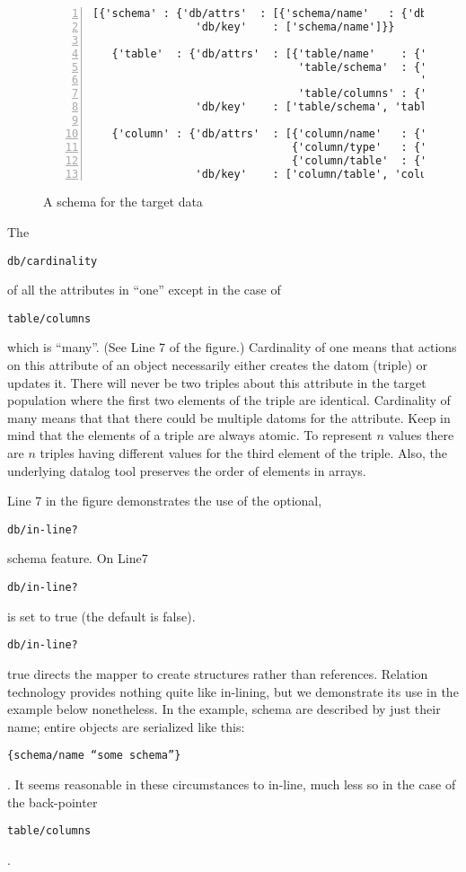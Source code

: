 \documentclass[9pt,letterpaper]{article}
\newcommand{\stt}[1]{\begin{footnotesize}\texttt{#1}\end{footnotesize}}
\begin{document}
\begin{figure}[H]
  \caption{A schema for the target data}
  \label{code:example-schema-1}
\begin{lstlisting}[numberstyle=\scriptsize,basicstyle=\ttfamily\scriptsize,numbers=left,stepnumber=1,breaklines=true]
  [{'schema' : {'db/attrs'  : [{'schema/name'   : {'db/type' : 'string', 'db/cardinality' : 'one'}}],
                'db/key'    : ['schema/name']}}

   {'table'  : {'db/attrs'  : [{'table/name'    : {'db/type' : 'string', 'db/cardinality' : 'one' },
                                'table/schema'  : {'db/type' : 'object', 'db/cardinality' : 'one',
                                                   'db/in-line?' : true},
                                'table/columns' : {'db/type' : 'object', 'db/cardinality' : 'many'}}],
                'db/key'    : ['table/schema', 'table/name']}}

   {'column' : {'db/attrs'  : [{'column/name'   : {'db/type' : 'string', 'db/cardinality' : 'one'}},
                               {'column/type'   : {'db/type' : 'string', 'db/cardinality' : 'one'}},
                               {'column/table'  : {'db/type' : 'object', 'db/cardinality' : 'one'}}],
                'db/key'    : ['column/table', 'column/name']}}]
\end{lstlisting}
\end{figure}

The \stt{db/cardinality} of all the attributes in ``one'' except in the case of \stt{table/columns} which is ``many''.
(See Line 7 of the figure.)
Cardinality of one means that actions on this attribute of an object necessarily either creates the datom (triple) or updates it.
There will never be two triples about this attribute in the target population where the first two elements of the triple are identical.
Cardinality of many means that that there could be multiple datoms for the attribute.
Keep in mind that the elements of a triple are always atomic.
To represent $n$ values there are $n$ triples having different values for the third element of the triple.
Also, the underlying datalog tool preserves the order of elements in arrays.

Line 7 in the figure demonstrates the use of the optional, \stt{db/in-line?} schema feature.
On Line7 \stt{db/in-line?} is set to true (the default is false).
\stt{db/in-line?} true directs the mapper to create structures rather than references.
Relation technology provides nothing quite like in-lining, but we demonstrate its use in the example below nonetheless.
In the example, schema are described by just their name; entire objects are serialized like this: \stt{\{schema/name ``some schema''\}}.
It seems reasonable in these circumstances to in-line, much less so in the case of the back-pointer \stt{table/columns}.
\end{document}

